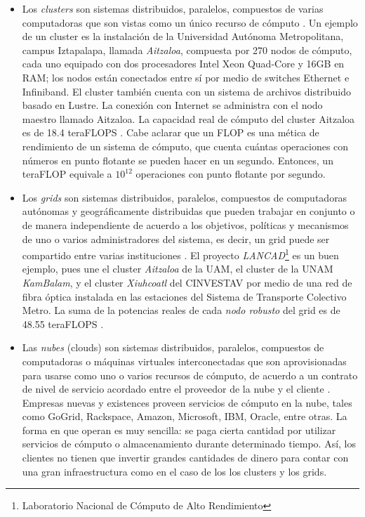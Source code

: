 \documentclass[letterpaper]{report}
\begin{document}
\begin{itemize}
\item Los \emph{clusters} son sistemas distribuidos, paralelos, compuestos de varias computadoras que son vistas como un único recurso de cómputo \cite{buyya2009cloud}. Un ejemplo de un cluster es la instalación de la Universidad Autónoma Metropolitana, campus Iztapalapa, llamada \emph{Aitzaloa}, compuesta por 270 nodos de cómputo, cada uno equipado con dos procesadores Intel Xeon Quad-Core y 16GB en RAM; los nodos están conectados entre sí por medio de switches Ethernet e Infiniband. El cluster también cuenta con un sistema de archivos distribuido basado en Lustre. La conexión con Internet se administra con el nodo maestro llamado Aitzaloa. La capacidad real de cómputo del cluster Aitzaloa es de 18.4 teraFLOPS \cite{uamz2013tizaloa}. Cabe aclarar que un FLOP es una mética de rendimiento de un sistema de cómputo, que cuenta cuántas operaciones con números en punto flotante se pueden hacer en un segundo. Entonces, un teraFLOP equivale a $10^{12}$ operaciones con punto flotante por segundo.

\item Los \emph{grids} son sistemas distribuidos, paralelos, compuestos de computadoras autónomas y geográficamente distribuidas que pueden trabajar en conjunto o de manera independiente de acuerdo a los objetivos, políticas y mecanismos de uno o varios administradores del sistema, es decir, un grid puede ser compartido entre varias instituciones \cite{buyya2009cloud}. El proyecto \emph{LANCAD}\footnote{Laboratorio Nacional de Cómputo de Alto Rendimiento} es un buen ejemplo, pues une el cluster \emph{Aitzaloa} de la UAM, el cluster de la UNAM \emph{KamBalam}, y el cluster \emph{Xiuhcoatl} del CINVESTAV por medio de una red de fibra óptica instalada en las estaciones del Sistema de Transporte Colectivo Metro. La suma de la potencias reales de cada \emph{nodo robusto} del grid es de 48.55 teraFLOPS \cite{lancad2013xiuhcoatl}.

\item Las \emph{nubes} (clouds) son sistemas distribuidos, paralelos, compuestos de computadoras o máquinas virtuales interconectadas que son aprovisionadas para usarse como uno o varios recursos de cómputo, de acuerdo a un contrato de nivel de servicio acordado entre el proveedor de la nube y el cliente \cite{buyya2009cloud}. Empresas nuevas y existences proveen servicios de cómputo en la nube, tales como GoGrid, Rackspace, Amazon, Microsoft, IBM, Oracle, entre otras. La forma en que operan es muy sencilla: se paga cierta cantidad por utilizar servicios de cómputo o almacenamiento durante determinado tiempo. Así, los clientes no tienen que invertir grandes cantidades de dinero para contar con una gran infraestructura como en el caso de los los clusters y los grids.
\end{itemize}
\end{document}
